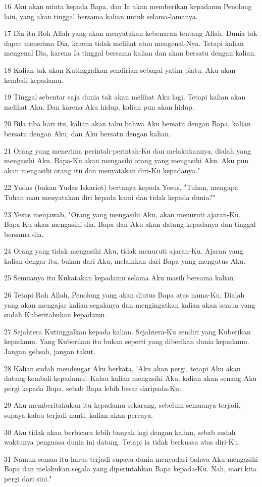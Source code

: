 \par 16 Aku akan minta kepada Bapa, dan Ia akan memberikan kepadamu Penolong lain, yang akan tinggal bersama kalian untuk selama-lamanya.
\par 17 Dia itu Roh Allah yang akan menyatakan kebenaran tentang Allah. Dunia tak dapat menerima Dia, karena tidak melihat atau mengenal-Nya. Tetapi kalian mengenal Dia, karena Ia tinggal bersama kalian dan akan bersatu dengan kalian.
\par 18 Kalian tak akan Kutinggalkan sendirian sebagai yatim piatu. Aku akan kembali kepadamu.
\par 19 Tinggal sebentar saja dunia tak akan melihat Aku lagi. Tetapi kalian akan melihat Aku. Dan karena Aku hidup, kalian pun akan hidup.
\par 20 Bila tiba hari itu, kalian akan tahu bahwa Aku bersatu dengan Bapa, kalian bersatu dengan Aku, dan Aku bersatu dengan kalian.
\par 21 Orang yang menerima perintah-perintah-Ku dan melakukannya, dialah yang mengasihi Aku. Bapa-Ku akan mengasihi orang yang mengasihi Aku. Aku pun akan mengasihi orang itu dan menyatakan diri-Ku kepadanya."
\par 22 Yudas (bukan Yudas Iskariot) bertanya kepada Yesus, "Tuhan, mengapa Tuhan mau menyatakan diri kepada kami dan tidak kepada dunia?"
\par 23 Yesus menjawab, "Orang yang mengasihi Aku, akan menuruti ajaran-Ku. Bapa-Ku akan mengasihi dia. Bapa dan Aku akan datang kepadanya dan tinggal bersama dia.
\par 24 Orang yang tidak mengasihi Aku, tidak menuruti ajaran-Ku. Ajaran yang kalian dengar itu, bukan dari Aku, melainkan dari Bapa yang mengutus Aku.
\par 25 Semuanya itu Kukatakan kepadamu selama Aku masih bersama kalian.
\par 26 Tetapi Roh Allah, Penolong yang akan diutus Bapa atas nama-Ku, Dialah yang akan mengajar kalian segalanya dan mengingatkan kalian akan semua yang sudah Kuberitahukan kepadamu.
\par 27 Sejahtera Kutinggalkan kepada kalian. Sejahtera-Ku sendiri yang Kuberikan kepadamu. Yang Kuberikan itu bukan seperti yang diberikan dunia kepadamu. Jangan gelisah, jangan takut.
\par 28 Kalian sudah mendengar Aku berkata, 'Aku akan pergi, tetapi Aku akan datang kembali kepadamu'. Kalau kalian mengasihi Aku, kalian akan senang Aku pergi kepada Bapa, sebab Bapa lebih besar daripada-Ku.
\par 29 Aku memberitahukan itu kepadamu sekarang, sebelum semuanya terjadi, supaya kalau terjadi nanti, kalian akan percaya.
\par 30 Aku tidak akan berbicara lebih banyak lagi dengan kalian, sebab sudah waktunya penguasa dunia ini datang. Tetapi ia tidak berkuasa atas diri-Ku.
\par 31 Namun semua itu harus terjadi supaya dunia menyadari bahwa Aku mengasihi Bapa dan melakukan segala yang diperintahkan Bapa kepada-Ku. Nah, mari kita pergi dari sini."

